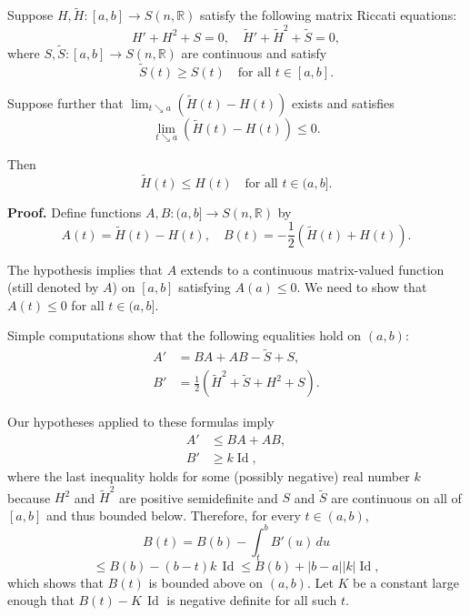 \begin{theorem}
\label{thm:matrix-riccati-comparison}

Suppose $H, \tilde{H}: [a,b] \to S(n, \mathbb{R})$ satisfy the following matrix Riccati equations:
\begin{equation}
H' + H^2 + S = 0, \quad \tilde{H}' + \tilde{H}^2 + \tilde{S} = 0,
\tag{11.10}
\end{equation}
where $S, \tilde{S}: [a,b] \to S(n, \mathbb{R})$ are continuous and satisfy
\begin{equation}
\tilde{S}(t) \ge S(t) \quad \text{for all } t \in [a,b].
\tag{11.11}
\end{equation}

Suppose further that $\lim_{t \searrow a} (\tilde{H}(t) - H(t))$ exists and satisfies
\begin{equation}
\lim_{t \searrow a} (\tilde{H}(t) - H(t)) \le 0.
\tag{11.12}
\end{equation}

Then
\begin{equation}
\tilde{H}(t) \le H(t) \quad \text{for all } t \in (a,b].
\tag{11.13}
\end{equation}
\end{theorem}

\noindent\textbf{Proof.} Define functions $A, B: (a,b] \to S(n, \mathbb{R})$ by
\[
A(t) = \tilde{H}(t) - H(t), \quad B(t) = -\frac{1}{2}(\tilde{H}(t) + H(t)).
\]

The hypothesis implies that $A$ extends to a continuous matrix-valued function (still denoted by $A$) on $[a,b]$ satisfying $A(a) \le 0$. We need to show that $A(t) \le 0$ for all $t \in (a,b]$.

Simple computations show that the following equalities hold on $(a,b)$:
\begin{align*}
A' &= BA + AB - \tilde{S} + S,\\
B' &= \tfrac{1}{2}(\tilde{H}^2 + \tilde{S} + H^2 + S).
\end{align*}

Our hypotheses applied to these formulas imply
\begin{align*}
A' &\le BA + AB, \tag{11.14}\\
B' &\ge k \mathop{\mathrm{Id}}, \tag{11.15}
\end{align*}
where the last inequality holds for some (possibly negative) real number $k$ because $H^2$ and $\tilde{H}^2$ are positive semidefinite and $S$ and $\tilde{S}$ are continuous on all of $[a,b]$ and thus bounded below. Therefore, for every $t \in (a,b)$,
\begin{equation}
B(t) = B(b) - \int_t^b B'(u) \, du \tag{11.16}
\end{equation}
\[
\le B(b) - (b-t)k \, \mathop{\mathrm{Id}} \le B(b) + |b-a||k|\mathop{\mathrm{Id}},
\]
which shows that $B(t)$ is bounded above on $(a,b)$. Let $K$ be a constant large enough that $B(t) - K \, \mathop{\mathrm{Id}}$ is negative definite for all such $t$.

